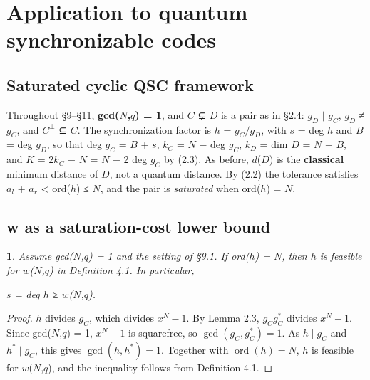 \documentclass[pdflatex,sn-mathphys-num]{sn-jnl}
\theoremstyle{thmstyleone}
\newcommand{\thmxname}{}
\newtheorem*{thmxinner}{\thmxname}
\newenvironment{thmx}[1]{\renewcommand{\thmxname}{#1}\begin{thmxinner}}{\end{thmxinner}}
\theoremstyle{thmstylethree}
\begin{document}
\section{Application to quantum synchronizable codes}

\subsection{Saturated cyclic QSC framework}

Throughout §9--§11, \textbf{gcd(\(N\),\(q\)) = 1}, and \(C\) ⊊ \(D\) is a pair as in §2.4: \(g_D\) \(\mid\) \(g_C\), \(g_D\) ≠ \(g_C\), and \(C^⊥\) ⊆ \(C\). The synchronization factor is \(h\) = \(g_C/g_D\), with \(s\) = deg \(h\) and \(B\) = deg \(g_D\), so that deg \(g_C\) = \(B\) + \(s\), \(k_C\) = \(N\) − deg \(g_C\), \(k_D\) = dim \(D\) = \(N\) − \(B\), and \(K\) = \(2k_C\) − \(N\) = \(N\) − 2 deg \(g_C\) by (2.3). As before, \(d\)(\(D\)) is the \textbf{classical} minimum distance of \(D\), not a quantum distance. By (2.2) the tolerance satisfies \(a_l\) + \(a_r\) \textless{} ord(\(h\)) ≤ \(N\), and the pair is \emph{saturated} when ord(\(h\)) = \(N\).

\subsection{w as a saturation-cost lower bound}

\begin{thmx}{Proposition 9.1 (saturation cost)}

Assume gcd(\(N\),\(q\)) = 1 and the setting of §9.1. If ord(\(h\)) = \(N\), then \(h\) is feasible for \(w\)(\(N\),\(q\)) in Definition 4.1. In particular,

\begin{center}\(s\) = deg \(h\) ≥ \(w\)(\(N\),\(q\)).\end{center}

\end{thmx}

\begin{proof}[Proof]

\(h\) divides \(g_C\), which divides \(x^N-1\). By Lemma 2.3, \(g_Cg_C^{*}\) divides \(x^N-1\). Since gcd(\(N\),\(q\)) = 1, \(x^N-1\) is squarefree, so \(\gcd(g_C,g_C^{*})=1\). As \(h\mid g_C\) and \(h^{*}\mid g_C\), this gives \(\gcd(h,h^{*})=1\). Together with \(\operatorname{ord}(h)=N\), \(h\) is feasible for \(w\)(\(N\),\(q\)), and the inequality follows from Definition 4.1.

\end{proof}
\end{document}
